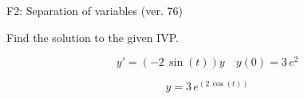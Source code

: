 \begin{exercise}
  \begin{exerciseTitle}F2: Separation of variables (ver. 76)\end{exerciseTitle}
  \begin{exerciseStatement}
    
Find the solution to the given IVP.

    
\[y'=( -2 \, \sin\left(t\right) )y\hspace{1em} y(0)= 3 \, e^{2}\]

  \end{exerciseStatement}
  \begin{exerciseAnswer}
    
\[y= 3 \, e^{\left(2 \, \cos\left(t\right)\right)}\]

  \end{exerciseAnswer}
\end{exercise}